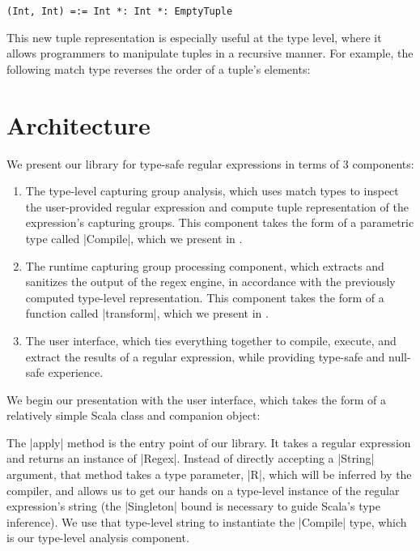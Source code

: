 \begin{lstlisting}
(Int, Int) =:= Int *: Int *: EmptyTuple
\end{lstlisting}

\noindent
This new tuple representation is especially useful at the type level, where it allows programmers to manipulate tuples in a recursive manner.
For example, the following match type reverses the order of a tuple's elements:

\tupleReverseA
\vspace{-3pt}
\tupleReverseB

\section{Architecture}
\label{sec:architecture}

We present our library for type-safe regular expressions in terms of 3 components:

\begin{enumerate}
  \item The type-level capturing group analysis, which uses match types to inspect the user-provided regular expression and compute tuple representation of the expression's capturing groups.
  This component takes the form of a parametric type called |Compile|, which we present in .

  \item The runtime capturing group processing component, which extracts and sanitizes the output of the regex engine, in accordance with the previously computed type-level representation.
  This component takes the form of a function called |transform|, which we present in .

  \item The user interface, which ties everything together to compile, execute, and extract the results of a regular expression, while providing type-safe and null-safe experience.
\end{enumerate}

We begin our presentation with the user interface, which takes the form of a relatively simple Scala class and companion object:

\regexUserLevel

The |apply| method is the entry point of our library.
It takes a regular expression and returns an instance of |Regex|.
Instead of directly accepting a |String| argument, that method takes a type parameter, |R|, which will be inferred by the compiler, and allows us to get our hands on a type-level instance of the regular expression's string (the |Singleton| bound is necessary to guide Scala's type inference).
We use that type-level string to instantiate the |Compile| type, which is our type-level analysis component.

